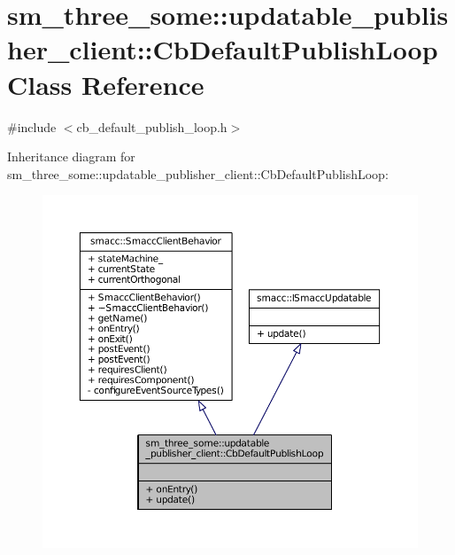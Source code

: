 \hypertarget{classsm__three__some_1_1updatable__publisher__client_1_1CbDefaultPublishLoop}{}\section{sm\+\_\+three\+\_\+some\+:\+:updatable\+\_\+publisher\+\_\+client\+:\+:Cb\+Default\+Publish\+Loop Class Reference}
\label{classsm__three__some_1_1updatable__publisher__client_1_1CbDefaultPublishLoop}


{\ttfamily \#include $<$cb\+\_\+default\+\_\+publish\+\_\+loop.\+h$>$}



Inheritance diagram for sm\+\_\+three\+\_\+some\+:\+:updatable\+\_\+publisher\+\_\+client\+:\+:Cb\+Default\+Publish\+Loop\+:
\nopagebreak
\begin{figure}[H]
\begin{center}
\leavevmode
\includegraphics[width=350pt]{classsm__three__some_1_1updatable__publisher__client_1_1CbDefaultPublishLoop__inherit__graph}
\end{center}
\end{figure}


